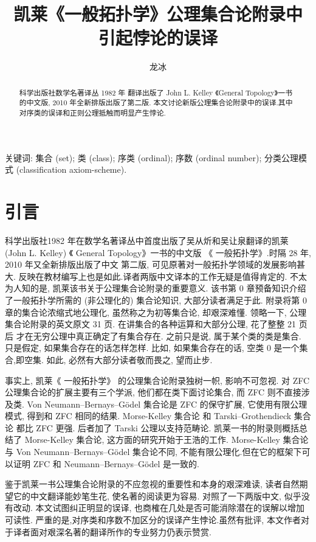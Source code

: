 \documentclass[zihao=-4,a4paper]{ctexart}
\title{凯莱《一般拓扑学》公理集合论附录中\\ 引起悖论的误译}
\author{龙\quad 冰}
\date{}
\begin{document}
\maketitle
\begin{abstract}
科学出版社数学名著译丛 1982 年 翻译出版了 John L. Kelley 《General Topology》一书的中文版,  2010 年全新排版出版了第二版.
本文讨论新版公理集合论附录中的误译.其中对序类的误译和正则公理抵触而明显产生悖论.
\end{abstract}
	
关键词: 集合 (set); 类 (class); 序类 (ordinal); 
	序数 (ordinal number); 
	分类公理模式 (classification axiom-scheme).
	
	
	
\section{引言}
科学出版社1982 年在数学名著译丛中首度出版了吴从炘和吴让泉翻译的凯莱  (John L. Kelley) 《 General  Topology》\cite{jkelley1975}一书的中文版 《 一般拓扑学》.时隔 28 年, 2010 年又全新排版出版了中文 第二版\cite{jkelley2010zh}, 可见原著对一般拓扑学领域的发展影响甚大. 反映在教材编写上也是如此\cite{PuJiangHu1985}.译者两版中文译本的工作无疑是值得肯定的. 不太为人知的是, 凯莱该书关于公理集合论附录的重要意义. 该书第 0 章预备知识介绍了一般拓扑学所需的 (非公理化的) 集合论知识, 大部分读者满足于此. 
附录将第 0 章的集合论浓缩式地公理化, 虽然称之为初等集合论, 却艰深难懂. 领略一下, 公理集合论附录的英文原文 31 页. 在讲集合的各种运算和大部分公理, 花了整整 21 页后
才在无穷公理中真正确定了有集合存在. 之前只是说, 属于某个类的类是集合. 只是假定, 如果集合存在的话怎样怎样. 比如, 如果集合存在的话, 空类 0 是一个集合,即空集. 如此, 必然有大部分读者敬而畏之, 望而止步. 

事实上, 凯莱《 一般拓扑学》 的公理集合论附录独树一帜, 影响不可忽视. 对 ZFC 公理集合论\cite{jjiang1991}\cite{enderton1977}的扩展主要有三个学派\cite{wikiSetTheory}, 他们都在类下面讨论集合, 而 ZFC 则不直接涉及类. Von Neumann–Bernays–Gödel 集合论\cite{wikiNBGSetTheory}是 ZFC 的保守扩展,  它使用有限公理模式, 得到和 ZFC 相同的结果. 
Morse-Kelley 集合论\cite{wikiMKSetTheory} 和 Tarski–Grothendieck 集合论\cite{wikiTGSetTheory} 都比 ZFC 更强. 后者加了 Tarski 公理以支持范畴论. 凯莱一书的附录则概括总结了 Morse-Kelley 集合论,
这方面的研究开始于王浩的工作\cite{wang1949}. Morse-Kelley 集合论与 Von Neumann–Bernays–Gödel  集合论不同, 不能有限公理化.但在它的框架下可以证明 ZFC 和 Neumann–Bernays–Gödel 是一致的.

鉴于凯莱一书公理集合论附录的不应忽视的重要性和本身的艰深难读, 读者自然期望它的中文翻译能妙笔生花, 使名著的阅读更为容易. 对照了一下两版中文, 似乎没有改动. 本文试图纠正明显的误译, 也商榷在几处是否可能消除潜在的误解以增加可读性. 严重的是,对序类和序数不加区分的误译产生悖论.虽然有批评, 本文作者对于译者面对艰深名著的翻译所作的专业努力仍表示赞赏.
\end{document}
